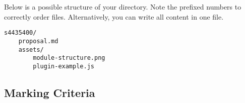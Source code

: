 \documentclass{csse4400}
\begin{document}
\noindent
Below is a possible structure of your directory. Note the prefixed numbers to correctly order files.
Alternatively, you can write all content in one file.

\begin{verbatim}
s4435400/
    proposal.md
    assets/
        module-structure.png
        plugin-example.js
\end{verbatim}


\clearpage
\begin{landscape}
\fontsize{9}{11}\selectfont
\begin{adjustwidth}{-5mm}{-5mm}

\section{Marking Criteria}



\end{adjustwidth}
\end{landscape}
\end{document}
